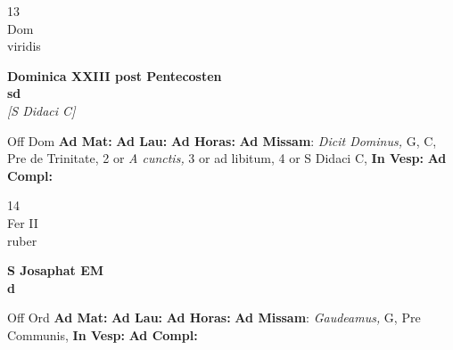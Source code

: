 \documentclass[10pt, openany]{book}
\begin{document}
        \begin{center}
            \begin{minipage}{3.5in}
                \vspace{2em}
                \begin{minipage}{0.5in}
                    {\Huge 13} \\
                    {\normalsize Dom} \\
                    {\normalsize viridis}
                \end{minipage}
                \begin{minipage}{3.0in}
                    \textbf{ \large Dominica XXIII post Pentecosten \\
                    \textnormal{\normalsize sd}} \\ \textit{[S Didaci C]} \\ 
                \end{minipage}
                \begin{justify}Off Dom
                    \textbf{Ad Mat: }
                    \textbf{Ad Lau: }
                    \textbf{Ad Horas: }\textbf{Ad Missam}: \textit{Dicit Dominus,} G, C, Pre de Trinitate, 2 or \textit{A cunctis,} 3 or ad libitum, 4 or S Didaci C,  
                    \textbf{In Vesp: }
                    \textbf{Ad Compl: }
                \end{justify}
            \end{minipage}
        \end{center}
    
        \begin{center}
            \begin{minipage}{3.5in}
                \vspace{2em}
                \begin{minipage}{0.5in}
                    {\Huge 14} \\
                    {\normalsize Fer II} \\
                    {\normalsize ruber}
                \end{minipage}
                \begin{minipage}{3.0in}
                    \textbf{ \large S Josaphat EM \\
                    \textnormal{\normalsize d}} \\ 
                \end{minipage}
                \begin{justify}Off Ord
                    \textbf{Ad Mat: }
                    \textbf{Ad Lau: }
                    \textbf{Ad Horas: }\textbf{Ad Missam}: \textit{Gaudeamus,} G, Pre Communis,  
                    \textbf{In Vesp: }
                    \textbf{Ad Compl: }
                \end{justify}
            \end{minipage}
        \end{center}
    
\end{document}
